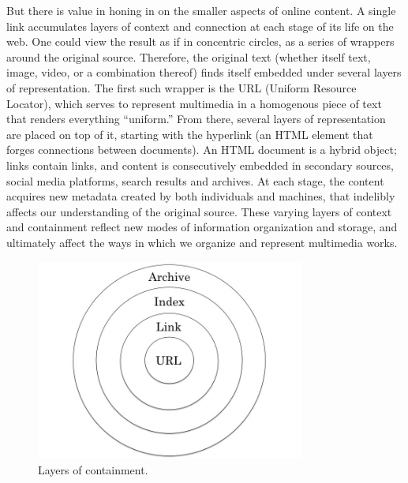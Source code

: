 But there is value in honing in on the smaller aspects of online content. A single link accumulates layers of context and connection at each stage of its life on the web. One could view the result as if in concentric circles, as a series of wrappers around the original source. Therefore, the original text (whether itself text, image, video, or a combination thereof) finds itself embedded under several layers of representation. The first such wrapper is the URL (Uniform Resource Locator), which serves to represent multimedia in a homogenous piece of text that renders everything ``uniform.'' From there, several layers of representation are placed on top of it, starting with the hyperlink (an HTML element that forges connections between documents). An HTML document is a hybrid object; links contain links, and content is consecutively embedded in secondary sources, social media platforms, search results and archives. At each stage, the content acquires new metadata created by both individuals and machines, that indelibly affects our understanding of the original source. These varying layers of context and containment reflect new modes of information organization and storage, and ultimately affect the ways in which we organize and represent multimedia works.

\begin{figure}[ht]
\centering
\includegraphics[width=250pt]{figures/layersofcontainment}
\caption{Layers of containment.}
\label{fig:layersofcontainment}
\end{figure}

